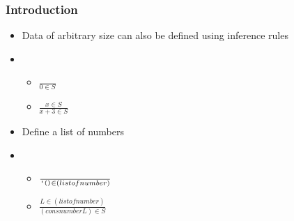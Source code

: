 \documentclass{beamer}
\newcommand{\elist}{\texttt{\textquotesingle{()}}}
\begin{document}
\begin{frame}[fragile]
\frametitle{Introduction}
\begin{scriptsize}
\begin{itemize}
\item<1-> Data of arbitrary size can also be defined using inference rules

\item<2->
  \begin{itemize}
    \item<2-> $\frac{}{0\in{}S}$\newline \\

    \item<2-> $\frac{x\in{}S}{x+3\in{}S}$
  \end{itemize}

\item<3-> Define a list of numbers

\item<4->
  \begin{itemize}
    \item $\frac{}{\elist{}\in{}(listof number)}$\newline \\

    \item $\frac{L\in{}(listof number)}{(cons number L)\in{}S}$
  \end{itemize}

\end{itemize}
\end{scriptsize}
\end{frame}
\end{document}
